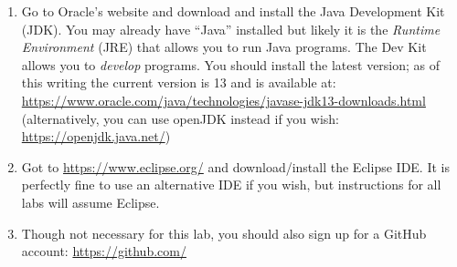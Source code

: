 \documentclass[12pt]{scrartcl}
\begin{document}
\begin{enumerate}
  \item Go to Oracle's website and download and install the 
  Java Development Kit (JDK).  You may already have ``Java''
  installed but likely it is the \emph{Runtime Environment} (JRE)
  that allows you to run Java programs.  The Dev Kit allows you
  to \emph{develop} programs.  You should install the latest version;
  as of this writing the current version is 13 and is available at:
  \url{https://www.oracle.com/java/technologies/javase-jdk13-downloads.html}
  (alternatively, you can use openJDK instead if you wish: \url{https://openjdk.java.net/})
  \item Got to \url{https://www.eclipse.org/} and download/install
  the Eclipse IDE.  It is perfectly fine to use an alternative 
  IDE if you wish, but instructions for all labs will assume Eclipse.  
  \item Though not necessary for this lab, you should also sign
  up for a GitHub account: \url{https://github.com/}
\end{enumerate}
\end{document}
